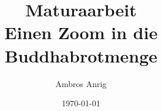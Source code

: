 

\title{Maturaarbeit \\ Einen Zoom in die Buddhabrotmenge}
\author{Ambros Anrig}
\date{\today}



\maketitle
\thispagestyle{empty}

\clearpage
\tableofcontents
\thispagestyle{empty}












